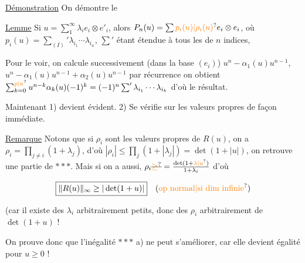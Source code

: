 \uline{Démonstration} On démontre le

\uline{Lemme} Si  $u=\sum_1^\infty\lambda_i e_i\otimes e'_i$, alors $P_n(u)=\sum\unsure{p_i(u)|\rho_i(u)}e_i\otimes e_i$, où $p_i(u)=\sum_{(I)}'\lambda_{i_1}\cdots\lambda_{i_n}$, $\sum'$ étant étendue à tous les   de $n$ indices, 

Pour le voir, on calcule successivement (dans la base $(e_i)$) $u^n-$$\alpha_1(u)u^{n-1}$, $u^n-\alpha_1(u)u^{n-1}+\alpha_2(u)u^{n-1}$ par récurrence on obtient $\sum_{k=0}^{\unsure{p|n}}u^{n-k}\alpha_k(u)(-1)^k=(-1)^n\sum'\lambda_{i_1}\cdots\lambda_{i_k}$ d'où  le résultat.

Maintenant 1) devient évident. 2) Se vérifie sur les valeurs propres de façon immédiate.

\uline{Remarque} Notons que si $\rho_i$ sont les valeurs propres de $R(u)$, on a $\rho_i=\prod_{j\neq i}(1+\lambda_j)$, d'où $|\rho_i|\leq\prod_j(1+|\lambda_j|)=\det(1+\lvert u\rvert)$, on retrouve une
partie de $***$. Mais si  on a aussi,   $\rho_i\deleted{\unsure{\geq}}=\frac{\det(1+\unsure{\lambda|u})}{1+\lambda_i}$ \deleted{\unsure{$\geq$|$\leq$}} d'où

\[
\boxed{\|R(u)\|_\infty\geq|\det(1+u)|}\quad\text{(\unsure{op normal|si dim infinie})}
\]

(car il existe des $\lambda_i$ arbitrairement petits, donc des $\rho_i$ arbitrairement  de $\det(1+u)$ !

On  prouve donc que l'inégalité $***$ a) ne peut s'améliorer, car elle devient égalité pour $u\geq0$ !
